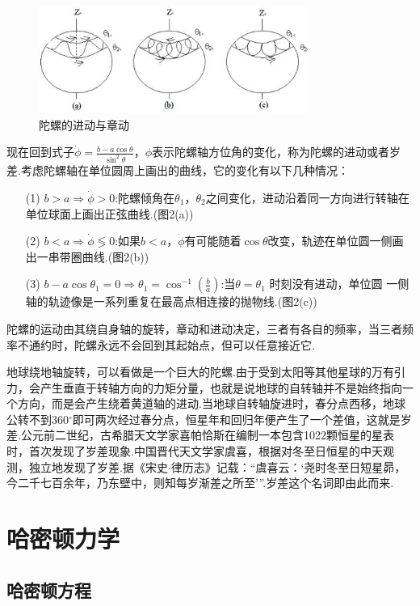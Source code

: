 \documentclass[UTF8,10.5pt,a4paper]{ctexart}
\numberwithin{equation}{section}
\theoremstyle{definition}
\theoremstyle{definition}
\begin{document}
\begin{figure}[h]
 \renewcommand{\captionfont}{\small}
 \centering
 \includegraphics[height=3.5cm]{tuoluo.jpg}
 \caption{陀螺的进动与章动}
 \end{figure}
\par 现在回到式子$\dot{\phi}=\frac{b - a\cos \theta}{\sin^{2}\theta}$，$\phi$表示陀螺轴方位角的变化，称为陀螺的进动或者岁差.考虑陀螺轴在单位圆周上画出的曲线，它的变化有以下几种情况：
\begin{itemize}
 \item [(1)]$b > a \Rightarrow \dot{\phi} > 0$:陀螺倾角在$\theta_{1}$，$\theta_{2}$之间变化，进动沿着同一方向进行转轴在单位球面上画出正弦曲线.(图2(a))
 \item [(2)]$b < a \Rightarrow \dot{\phi} \lessgtr 0 $:如果$b < a $，$\dot{\phi}$有可能随着$\cos \theta$改变，轨迹在单位圆一侧画出一串带圈曲线.(图2(b))
 \item [(3)]$b - a\cos \theta_{1} = 0 \Rightarrow\theta_{1} = \cos^{-1}\left( \frac{b}{a} \right)$:当$\theta = \theta_{1}$ 时刻没有进动，单位圆
 一侧轴的轨迹像是一系列重复在最高点相连接的抛物线.(图2(c))
 \end{itemize}
 \par 陀螺的运动由其绕自身轴的旋转，章动和进动决定，三者有各自的频率，当三者频率不通约时，陀螺永远不会回到其起始点，但可以任意接近它.\cite{AI3}
\par 地球绕地轴旋转，可以看做是一个巨大的陀螺.由于受到太阳等其他星球的万有引力，会产生垂直于转轴方向的力矩分量，也就是说地球的自转轴并不是始终指向一个方向，而是会产生绕着黄道轴的进动.当地球自转轴旋进时，春分点西移，地球公转不到360$^{\circ}$即可两次经过春分点，恒星年和回归年便产生了一个差值，这就是岁差.公元前二世纪，古希腊天文学家喜帕恰斯在编制一本包含1022颗恒星的星表时，首次发现了岁差现象.中国晋代天文学家虞喜，根据对冬至日恒星的中天观测，独立地发现了岁差.据《宋史$\cdot$律历志》记载：“虞喜云：‘尧时冬至日短星昴，今二千七百余年，乃东壁中，则知每岁渐差之所至'”.岁差这个名词即由此而来.
\newpage
\section{哈密顿力学}
\subsection{哈密顿方程}
\end{document}
